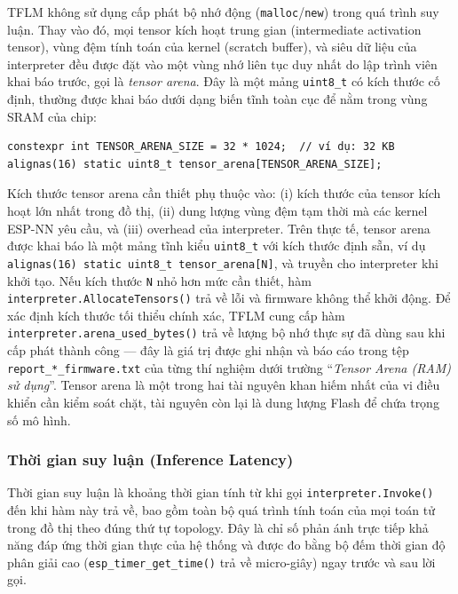 \documentclass[../DoAn.tex]{subfiles}
\begin{document}
TFLM không sử dụng cấp phát bộ nhớ động (\texttt{malloc}/\texttt{new}) trong quá trình suy luận. Thay vào đó, mọi tensor kích hoạt trung gian (intermediate activation tensor), vùng đệm tính toán của kernel (scratch buffer), và siêu dữ liệu của interpreter đều được đặt vào một vùng nhớ liên tục duy nhất do lập trình viên khai báo trước, gọi là \textit{tensor arena}. Đây là một mảng \texttt{uint8\_t} có kích thước cố định, thường được khai báo dưới dạng biến tĩnh toàn cục để nằm trong vùng SRAM của chip:

\begin{verbatim}
constexpr int TENSOR_ARENA_SIZE = 32 * 1024;  // ví dụ: 32 KB
alignas(16) static uint8_t tensor_arena[TENSOR_ARENA_SIZE];
\end{verbatim}

Kích thước tensor arena cần thiết phụ thuộc vào: (i) kích thước của tensor kích hoạt lớn nhất trong đồ thị, (ii) dung lượng vùng đệm tạm thời mà các kernel ESP-NN yêu cầu, và (iii) overhead của interpreter. Trên thực tế, tensor arena được khai báo là một mảng tĩnh kiểu \texttt{uint8\_t} với kích thước định sẵn, ví dụ \texttt{alignas(16) static uint8\_t tensor\_arena[N]}, và truyền cho interpreter khi khởi tạo. Nếu kích thước \texttt{N} nhỏ hơn mức cần thiết, hàm \texttt{interpreter.AllocateTensors()} trả về lỗi và firmware không thể khởi động. Để xác định kích thước tối thiểu chính xác, TFLM cung cấp hàm \texttt{interpreter.arena\_used\_bytes()} trả về lượng bộ nhớ thực sự đã dùng sau khi cấp phát thành công --- đây là giá trị được ghi nhận và báo cáo trong tệp \texttt{report\_*\_firmware.txt} của từng thí nghiệm dưới trường ``\textit{Tensor Arena (RAM) sử dụng}''. Tensor arena là một trong hai tài nguyên khan hiếm nhất của vi điều khiển cần kiểm soát chặt, tài nguyên còn lại là dung lượng Flash để chứa trọng số mô hình.

\subsubsection*{Thời gian suy luận (Inference Latency)}

Thời gian suy luận là khoảng thời gian tính từ khi gọi \texttt{interpreter.Invoke()} đến khi hàm này trả về, bao gồm toàn bộ quá trình tính toán của mọi toán tử trong đồ thị theo đúng thứ tự topology. Đây là chỉ số phản ánh trực tiếp khả năng đáp ứng thời gian thực của hệ thống và được đo bằng bộ đếm thời gian độ phân giải cao (\texttt{esp\_timer\_get\_time()} trả về micro-giây) ngay trước và sau lời gọi.
\end{document}
